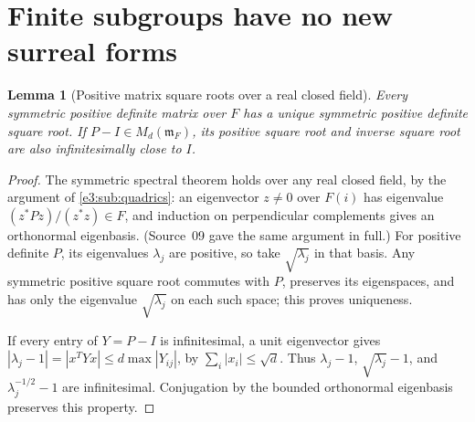 \documentclass[11pt,letterpaper]{article}
\numberwithin{equation}{section}
\newtheorem{lemma}[lemma]{Lemma}
\theoremstyle{definition}
\theoremstyle{remark}
\newcommand{\mm}{\mathfrak m}
\newcommand{\abs}[1]{\left|#1\right|}
\begin{document}
\section{Finite subgroups have no new surreal forms}\label{e3:so:sec:finitegroups}

\begin{lemma}[Positive matrix square roots over a real closed field]
\label{e3:so:lem:positiveroot}
Every symmetric positive definite matrix over \(F\) has a unique symmetric
positive definite square root. If \(P-I\in M_d(\mm_F)\), its positive square
root and inverse square root are also infinitesimally close to \(I\).
\end{lemma}
\begin{proof}
The symmetric spectral theorem holds over any real closed field, by the
argument of \cref{e3:sub:quadrics}: an eigenvector \(z\ne0\) over \(F(i)\) has
eigenvalue \((z^*Pz)/(z^*z)\in F\), and induction on perpendicular complements
gives an orthonormal eigenbasis. (Source~09 gave the same argument in full.)
For positive definite \(P\), its eigenvalues
\(\lambda_j\) are positive, so take \(\sqrt{\lambda_j}\) in that basis.
Any symmetric positive square root commutes with \(P\), preserves its
eigenspaces, and has only the eigenvalue \(\sqrt{\lambda_j}\) on each such
space; this proves uniqueness.

If every entry of \(Y=P-I\) is infinitesimal, a unit eigenvector gives
\(\abs{\lambda_j-1}=\abs{x^TYx}\le d\max\abs{Y_{ij}}\), by
\(\sum_i\abs{x_i}\le\sqrt d\). Thus \(\lambda_j-1\),
\(\sqrt{\lambda_j}-1\), and \(\lambda_j^{-1/2}-1\) are infinitesimal.
Conjugation by the bounded orthonormal eigenbasis preserves this property.
\end{proof}
\end{document}
